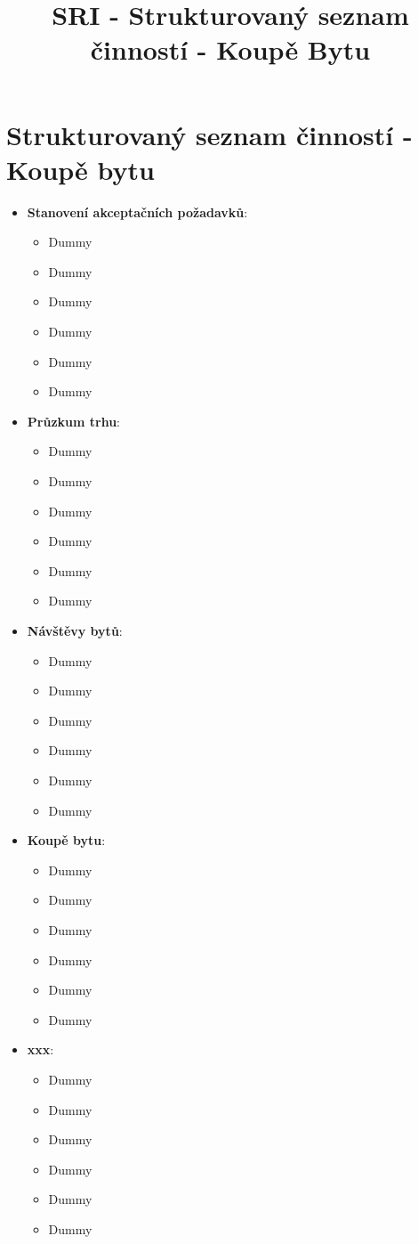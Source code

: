 \documentclass[a4paper,10pt]{article}
\title{SRI - Strukturovaný seznam činností - Koupě Bytu}
\begin{document}
\thispagestyle{empty}
\section*{Strukturovaný seznam činností - Koupě bytu}
\begin{itemize}
	\setlength{\itemsep}{3pt}
	
	\item \textbf{Stanovení akceptačních požadavků}:
		\begin{itemize}
			\item Dummy 
			\item Dummy 
			\item Dummy 
			\item Dummy 
			\item Dummy 
			\item Dummy 
		\end{itemize}
	
	\item \textbf{Průzkum trhu}:
		\begin{itemize}
			\item Dummy 
			\item Dummy 
			\item Dummy 
			\item Dummy 
			\item Dummy 
			\item Dummy 
		\end{itemize}
	
	\item \textbf{Návštěvy bytů}:
		\begin{itemize}
			\item Dummy 
			\item Dummy 
			\item Dummy 
			\item Dummy 
			\item Dummy 
			\item Dummy 
		\end{itemize}

	\item \textbf{Koupě bytu}:
		\begin{itemize}
			\item Dummy 
			\item Dummy 
			\item Dummy 
			\item Dummy 
			\item Dummy 
			\item Dummy 
		\end{itemize}

	\item \textbf{xxx}:
			\begin{itemize}
			\item Dummy 
			\item Dummy 
			\item Dummy 
			\item Dummy 
			\item Dummy 
			\item Dummy 
		\end{itemize}
\end{itemize}
\end{document}
